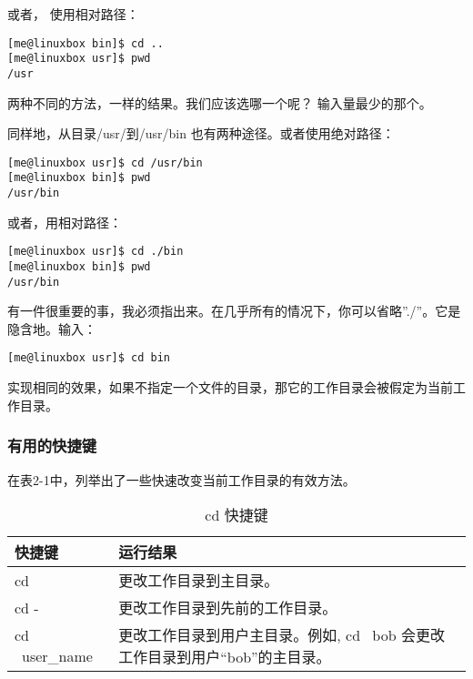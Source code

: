 \par 或者， 使用相对路径：

\begin{lstlisting}
[me@linuxbox bin]$ cd ..
[me@linuxbox usr]$ pwd
/usr
\end{lstlisting}

\par 两种不同的方法，一样的结果。我们应该选哪一个呢？ 输入量最少的那个。

\par 同样地，从目录/usr/到/usr/bin 也有两种途径。或者使用绝对路径：

\begin{lstlisting}
[me@linuxbox usr]$ cd /usr/bin
[me@linuxbox bin]$ pwd
/usr/bin
\end{lstlisting}

\par 或者，用相对路径：

\begin{lstlisting}
[me@linuxbox usr]$ cd ./bin
[me@linuxbox bin]$ pwd
/usr/bin
\end{lstlisting}

\par 有一件很重要的事，我必须指出来。在几乎所有的情况下，你可以省略”./”。它是隐含地。输入：
\begin{lstlisting}
[me@linuxbox usr]$ cd bin
\end{lstlisting}

\par 实现相同的效果，如果不指定一个文件的目录，那它的工作目录会被假定为当前工作目录。


\subsubsection{有用的快捷键} %
\label{ssub:有用的快捷键}
在表2-1中，列举出了一些快速改变当前工作目录的有效方法。


\begin{table}[ht!]
\caption{cd 快捷键}
\label{table_example}
\centering
\begin{tabular}{p{3cm}p{8cm}}
\hline
 快捷键 & 运行结果 \\
\hline
  cd	& 更改工作目录到主目录。 \\
  cd -	& 更改工作目录到先前的工作目录。\\
cd ~user\_name	& 更改工作目录到用户主目录。例如, cd ~bob 会更改工作目录到用户“bob”的主目录。\\
\hline
\end{tabular}
\end{table}

